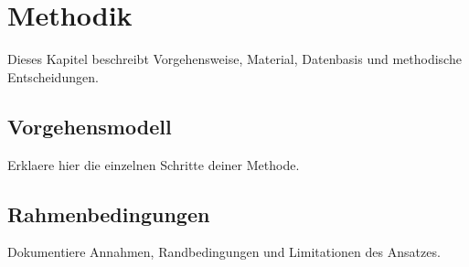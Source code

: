 \section{Methodik}

Dieses Kapitel beschreibt Vorgehensweise, Material, Datenbasis und
methodische Entscheidungen.

\subsection{Vorgehensmodell}

Erklaere hier die einzelnen Schritte deiner Methode.

\subsection{Rahmenbedingungen}

Dokumentiere Annahmen, Randbedingungen und Limitationen des Ansatzes.
